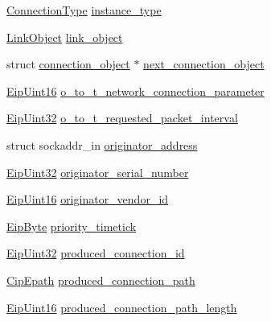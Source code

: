\begin{DoxyCompactItemize}
\item 
\hyperlink{cipconnectionmanager_8h_aa1f0e2efd52935fd01bfece0fbead81f}{\-Connection\-Type} \hyperlink{structconnection__object_ada63f5853b16b3fa0d3c49b894157540}{instance\-\_\-type}
\item 
\hyperlink{structLinkObject}{\-Link\-Object} \hyperlink{structconnection__object_a5166834835975a7e929324b18c630f6b}{link\-\_\-object}
\item 
struct \hyperlink{structconnection__object}{connection\-\_\-object} $\ast$ \hyperlink{structconnection__object_a490adc7536680841cb7542a7ed6cd829}{next\-\_\-connection\-\_\-object}
\item 
\hyperlink{typedefs_8h_ac1b4cfa25b4f5def62f23b455dd395d8}{\-Eip\-Uint16} \hyperlink{structconnection__object_af1d980ce6b30a318e559cf32d23aa0ec}{o\-\_\-to\-\_\-t\-\_\-network\-\_\-connection\-\_\-parameter}
\item 
\hyperlink{typedefs_8h_abf2dd49262551294eb990ef8746a2767}{\-Eip\-Uint32} \hyperlink{structconnection__object_abd6b69f5689bb2a72dadb2f92b5ff6ee}{o\-\_\-to\-\_\-t\-\_\-requested\-\_\-packet\-\_\-interval}
\item 
struct sockaddr\-\_\-in \hyperlink{structconnection__object_a122616a0d743a67d5333a79c57ba50b8}{originator\-\_\-address}
\item 
\hyperlink{typedefs_8h_abf2dd49262551294eb990ef8746a2767}{\-Eip\-Uint32} \hyperlink{structconnection__object_a1844f588d73d20ba979908e40172ffbf}{originator\-\_\-serial\-\_\-number}
\item 
\hyperlink{typedefs_8h_ac1b4cfa25b4f5def62f23b455dd395d8}{\-Eip\-Uint16} \hyperlink{structconnection__object_a84ec468763bc1ddbcba4d7162ea959ef}{originator\-\_\-vendor\-\_\-id}
\item 
\hyperlink{typedefs_8h_a168bac8db7e7e6d944700e1ac4717ae3}{\-Eip\-Byte} \hyperlink{structconnection__object_a85777ec91a547bda197f4740c189d18f}{priority\-\_\-timetick}
\item 
\hyperlink{typedefs_8h_abf2dd49262551294eb990ef8746a2767}{\-Eip\-Uint32} \hyperlink{structconnection__object_a1094de5e83a2b9f85b2a622c1a01bfbe}{produced\-\_\-connection\-\_\-id}
\item 
\hyperlink{structCipEpath}{\-Cip\-Epath} \hyperlink{structconnection__object_a0a9a5ce0afe8cd5890c11e901bc9a099}{produced\-\_\-connection\-\_\-path}
\item 
\hyperlink{typedefs_8h_ac1b4cfa25b4f5def62f23b455dd395d8}{\-Eip\-Uint16} \hyperlink{structconnection__object_a7c7b4c524189f7894f06ca75187a756c}{produced\-\_\-connection\-\_\-path\-\_\-length}

\end{DoxyCompactItemize}
